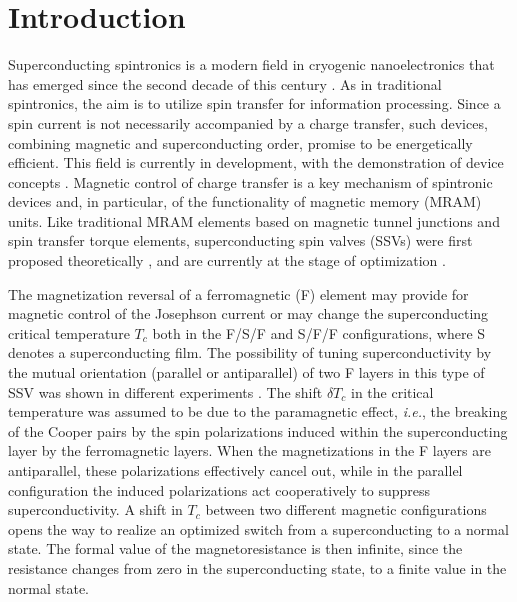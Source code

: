 \documentclass[prb,amsmath,amssymb,reprint]{revtex4-2}
\begin{document}
\date  \today

\maketitle

\section{Introduction}



Superconducting spintronics is a modern field in cryogenic nanoelectronics \cite{Roadmap2018} that has emerged since  the second decade of this century \cite{Eschrig2011}. As in traditional spintronics, the aim is to utilize spin transfer for
information processing.
Since a spin current is not necessarily  accompanied by a charge transfer, such devices, combining magnetic and superconducting order, promise to be energetically efficient. This field is currently in development,  with the demonstration of device concepts \cite{Robinson2014,Linder2015,Eschrig15b}. Magnetic control of charge transfer is a key mechanism of spintronic devices and, in particular, of the functionality of magnetic memory (MRAM) units.  Like traditional MRAM elements based on magnetic tunnel junctions and spin transfer torque elements, superconducting spin valves (SSVs) were  first proposed theoretically \cite%
{Beasley1997,BuzdinVed1999,Tagirov1999}, and are currently
at the stage of optimization \cite%
{Aarts2015,Garifullin2016,Birge2018a}.

The magnetization reversal of a ferromagnetic (F) element  may provide for magnetic control of the Josephson current \cite{Vedyayev2005,Kupriyanov2002,Ryazanov2012,Birge2018b} or may change the superconducting critical temperature $T_c$ both in the F/S/F \cite{Fominov2003} and S/F/F \cite%
{Fominov2010} configurations, where S denotes a superconducting film. The possibility of tuning superconductivity by the mutual orientation (parallel or antiparallel) of two F layers in this type of SSV was shown in different experiments
\cite{Gu2002,Potenza,Westerholt2005,Steiner}.
The shift $\delta T_{c}$ in the critical temperature was assumed to be due to the paramagnetic effect, {\it i.e.}, the breaking of the Cooper pairs by the spin polarizations induced within the superconducting layer by the ferromagnetic  layers. When the magnetizations in the F layers are antiparallel, these polarizations effectively cancel out, while in the parallel configuration the induced polarizations act cooperatively to suppress superconductivity.
A shift in $T_c$  between two different magnetic configurations opens the way to  realize an optimized switch from a superconducting to a normal state. The formal value of the magnetoresistance is then infinite, since the resistance changes from  zero in the superconducting state, to a finite value in the normal state.
\end{document}
